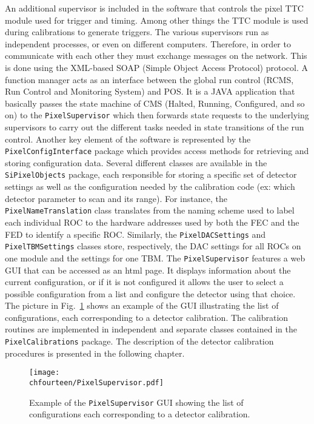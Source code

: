 An additional supervisor is included in the software that controls the pixel TTC module used for trigger and timing. Among other things the TTC module is used during calibrations to generate triggers.
The various supervisors run as independent processes, or even on different computers. Therefore, in order to communicate with each other they must exchange messages on the network. This is done using the XML-based SOAP (Simple Object Access Protocol) protocol.
A function manager acts as an interface between the global run control (RCMS, Run Control and Monitoring System) and POS.
It is a JAVA application that basically passes the state machine of CMS (Halted, Running, Configured, and so on) to the \texttt{PixelSupervisor} which then forwards state requests to the underlying supervisors to carry out the different tasks needed in state transitions of the run control.
Another key element of the software is represented by the \texttt{PixelConfigInterface} package which provides access methods for retrieving and storing configuration data.
Several different classes are available in the \texttt{SiPixelObjects} package, each responsible for storing a specific set of detector settings as well as the configuration needed by the calibration code (ex: which detector parameter to scan and its range).
For instance, the \texttt{PixelNameTranslation} class translates from the naming scheme used to label each individual ROC to the hardware addresses used by both the FEC and the FED to identify a specific ROC.
Similarly, the \texttt{PixelDACSettings} and \texttt{PixelTBMSettings} classes store, respectively, the DAC settings for all ROCs on one module and the settings for one TBM.
The \texttt{PixelSupervisor} features a web GUI that can be accessed as an html page.
It displays information about the current configuration, or if it is not configured it allows the user to select a possible configuration from a list and configure the detector using that choice.
The picture in Fig.~\ref{fig:PixGUI} shows an example of the GUI illustrating the list of configurations, each corresponding to a detector calibration.
The calibration routines are implemented in independent and separate classes contained in the \texttt{PixelCalibrations} package.
The description of the detector calibration procedures is presented in the following chapter.

\begin{figure}[!htb]
 \begin{center}
 \texttt{[image: \\chfourteen/PixelSupervisor.pdf]}
 \end{center}
 \caption{Example of the \texttt{PixelSupervisor} GUI showing the list of configurations each corresponding to a detector calibration.}
 \label{fig:PixGUI}
\end{figure}

